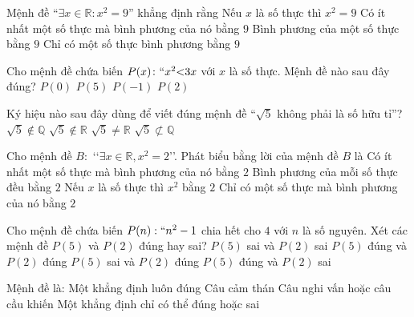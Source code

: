 \begin{ex}
Mệnh đề ``$\exists x \in \mathbb{R}\colon x^2=9$'' khẳng định rằng
\choice
{Nếu $x$ là số thực thì $x^2=9$}
{\True Có ít nhất một số thực mà bình phương của nó bằng $9$}
{Bình phương của một số thực bằng $9$}
{Chỉ có một số thực bình phương bằng $9$}
\end{ex}

\begin{ex}
Cho mệnh đề chứa biến $P(x)\colon \lq\lq x^2{<}3x$ với $x$ là số thực. Mệnh đề nào sau đây đúng?
\choice
{$P(0)$}
{$P(5)$}
{$P(-1)$}
{\True $P(2)$}
\end{ex}

\begin{ex}
Ký hiệu nào sau đây dùng để viết đúng mệnh đề ``$\sqrt{5}$ không phải là số hữu tỉ''?
\choice
{\True $\sqrt{5} \notin \mathbb{Q}$}
{$\sqrt{5} \notin \mathbb{R}$}
{$\sqrt{5} \neq \mathbb{R}$}
{$\sqrt{5} \not \subset \mathbb{Q}$}
\end{ex}

\begin{ex}
Cho mệnh đề $B\colon$ \lq\lq$\exists x \in \mathbb{R}, x^2 = 2$\rq\rq. Phát biểu bằng lời của mệnh đề $B$ là
\choice
{\True Có ít nhất một số thực mà bình phương của nó bằng $2$}
{Bình phương của mỗi số thực đều bằng $2$}
{Nếu $x$ là số thực thì $x^2$ bằng $2$}
{Chỉ có một số thực mà bình phương của nó bằng $2$}
\end{ex}

\begin{ex}
Cho mệnh đề chứa biến $P(n):``n^2-1$ chia hết cho $4$ với $n$ là số nguyên. Xét các mệnh đề $P(5)$ và $P(2)$ đúng hay sai?
\choice
{$P(5)$ sai và $P(2)$ sai}
{$P(5)$ đúng và $P(2)$ đúng}
{$P(5)$ sai và $P(2)$ đúng}
{\True $P(5)$ đúng và $P(2)$ sai}
\end{ex}

\begin{ex}
Mệnh đề là:
\choice
{Một khẳng định luôn đúng}
{Câu cảm thán}
{Câu nghi vấn hoặc câu cầu khiến}
{\True Một khẳng định chỉ có thể đúng hoặc sai}
\end{ex}

